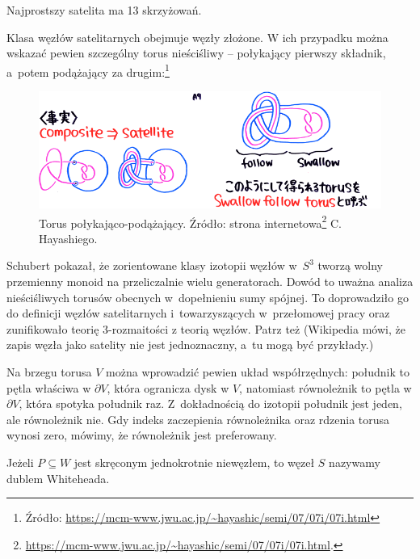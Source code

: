 Najprostszy satelita ma 13 skrzyżowań.

\begin{example}
    Klasa węzłów satelitarnych obejmuje węzły złożone.
    W ich przypadku można wskazać pewien szczególny torus nieściśliwy -- połykający pierwszy składnik, a~potem podążający za drugim:\footnote{Źródło: \url{https://mcm-www.jwu.ac.jp/~hayashic/semi/07/07i/07i.html}}
    \begin{figure}[H]
        \centering
        \includegraphics[width=0.75\linewidth]{../data/mixed/follow-swallow.png}
        \caption[something]{Torus połykająco-podążający. Źródło: strona internetowa\footnote{\url{https://mcm-www.jwu.ac.jp/~hayashic/semi/07/07i/07i.html}.} C. Hayashiego.}
    \end{figure}
\end{example}

Schubert pokazał, że zorientowane klasy izotopii węzłów w~$S^3$ tworzą wolny przemienny monoid na przeliczalnie wielu generatorach.
%
Dowód to uważna analiza nieściśliwych torusów obecnych w~dopełnieniu sumy spójnej.
To doprowadziło go do definicji węzłów satelitarnych i~towarzyszących w~przełomowej pracy \cite{schubert53} oraz zunifikowało teorię 3-rozmaitości z teorią węzłów.
Patrz też \cite{motegi97} (Wikipedia mówi, że zapis węzła jako satelity nie jest jednoznaczny, a~tu mogą być przykłady.)

Na brzegu torusa $V$ można wprowadzić pewien układ współrzędnych: południk to pętla właściwa w $\partial V$, która ogranicza dysk w $V$, natomiast równoleżnik to pętla w $\partial V$, która spotyka południk raz.
Z~dokładnością do izotopii południk jest jeden, ale równoleżnik nie.
Gdy indeks zaczepienia równoleżnika oraz rdzenia torusa wynosi zero, mówimy, że równoleżnik jest preferowany.

\begin{definition}
    Jeżeli $P \subseteq W$ jest skręconym jednokrotnie niewęzłem, to węzeł $S$ nazywamy dublem Whiteheada.
\end{definition}

